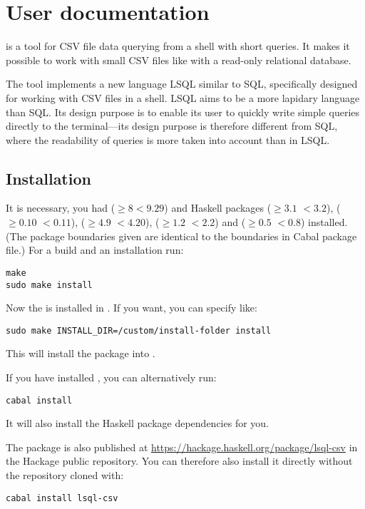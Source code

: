 \chapter{User documentation}
 is a tool for CSV file data querying from a shell with short queries. It makes it possible to work with small CSV files like with a read-only relational database.

The tool implements a new language LSQL similar to SQL, specifically designed for working with CSV files in a shell. LSQL aims to be a more lapidary language than SQL. Its design purpose is to enable its user to quickly write simple queries directly
  to the terminal---its design purpose is therefore different from SQL, where the readability of queries is more taken into account than in LSQL.

\section{Installation}
It is necessary, you had  ($\geq 8 <9.29$) and Haskell packages  ($\geq 3.1$ $<3.2$),  ($\geq 0.10$ $<0.11$), 
 ($\geq 4.9$ $<4.20$),  ($\geq 1.2$ $<2.2$) and  ($\geq 0.5$ $<0.8$)
 installed. (The package boundaries given are identical to the boundaries in Cabal package file.) For a build and an installation run:

\begin{verbatim}
make
sudo make install
\end{verbatim}

Now the  is installed in . If you want, you can specify  like:
\begin{verbatim}
sudo make INSTALL_DIR=/custom/install-folder install
\end{verbatim}
This will install the package into .

If you have installed , you can alternatively run:
\begin{verbatim}
cabal install
\end{verbatim}
It will also install the Haskell package dependencies for you.

The package is also published at \url{https://hackage.haskell.org/package/lsql-csv} in the Hackage public repository. You can therefore also install it directly without the repository cloned with:
\begin{verbatim}
cabal install lsql-csv
\end{verbatim}

